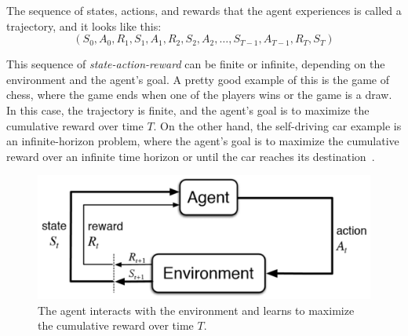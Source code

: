 \documentclass[../xlapes02]{subfiles}
\begin{document}

    The sequence of states, actions, and rewards that the agent experiences is called a trajectory, and it looks like this:
    \begin{equation}
        \label{eq:trajectory}
        (S_0, A_0, R_1, S_1, A_1, R_2, S_2, A_2, \dots, S_{T-1}, A_{T-1}, R_T, S_T)
    \end{equation}

    This sequence of \emph{state-action-reward} can be finite or infinite, depending on the environment and the agent's goal. A pretty good example of this is the game of chess, where the game ends when one of the players wins or the game is a draw. In this case, the trajectory is finite, and the agent's goal is to maximize the cumulative reward over time $T$. On the other hand, the self-driving car example is an infinite-horizon problem, where the agent's goal is to maximize the cumulative reward over an infinite time horizon or until the car reaches its destination~\cite{FITMT25127}.

    \begin{figure}[h]
        \includegraphics[width=0.7\linewidth]{image/agent-environment}
        \centering
        \caption{The agent interacts with the environment and learns to maximize the cumulative reward over time $T$.}
        \label{fig:rl-introduction}
    \end{figure}
\end{document}
